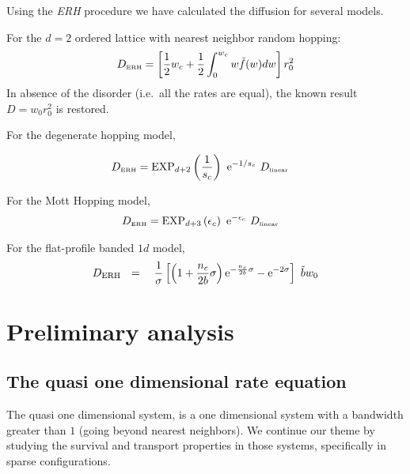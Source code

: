 Using the \emph{ERH} procedure we have calculated the diffusion for several models.


For the $d=2$ ordered lattice with nearest neighbor random hopping:
%
\begin{align}
D_{\mbox{\tiny ERH}} =  \left[\frac{1}{2}w_c + \frac{1}{2}\int_0^{w_c} w\tilde{f}(w) dw\right]r_0^2
\end{align}
%
In absence of the disorder (i.e.\ all the rates are equal),
the known result $D = w_0r_0^2$ is restored.


For the degenerate hopping model, 

\begin{align}
D_{\tbox{ERH}} &=  \mathrm{EXP}_{d{+}2}\left(\frac{1}{s_c}\right)  \  \eexp{-1/s_c}  \ D_{\tbox{linear}}
\end{align}
%


For the Mott Hopping model,
%
\begin{align}
D_{\tbox{ERH}} &=\mathrm{EXP}_{d{+}3}\left(\epsilon_c\right)  \  \eexp{-\epsilon_c}  \ D_{\tbox{linear}}
\end{align}
%


For the flat-profile banded $1d$ model,
\begin{align}
D_{\text{ERH}} \ \ = \ \ 
\ \frac{1}{\sigma}\left[ 
\left(1+\frac{n_c}{2b}\sigma\right)\eexp{-\frac{n_c}{2b}\sigma} - \eexp{-2\sigma}
\right] \ \tilde{b} w_0
\end{align}

\chapter{Preliminary analysis}





\section{The quasi one dimensional rate equation}

The quasi one dimensional system, is a one dimensional system
with a bandwidth greater than $1$ (going beyond nearest neighbors). 
We continue our theme by studying the survival and transport properties 
in those systems, specifically in sparse configurations.



